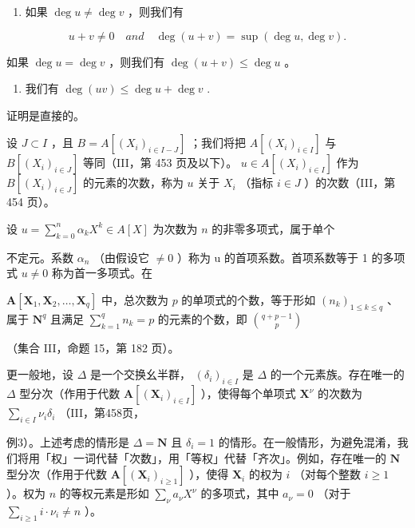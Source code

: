 \begin{enumerate}
\def\labelenumi{(\roman{enumi})}
\tightlist
\item
  如果 \(\deg u \neq \deg v\) ，则我们有
\end{enumerate}

\[
u + v \neq 0 \quad a n d \quad \deg (u + v) = \sup (\deg u, \deg v).
\]

如果 \(\deg u = \deg v\) ，则我们有 \(\deg (u + v) \leqslant \deg u\) 。

\begin{enumerate}
\def\labelenumi{(\roman{enumi})}
\setcounter{enumi}{1}
\tightlist
\item
  我们有 \(\deg(uv) \leqslant \deg u + \deg v\) .
\end{enumerate}

证明是直接的。

设 \(J \subset I\) ，且 \(B = A[(X_i)_{i \in I - J}]\) ；我们将把 \(A[(X_i)_{i \in I}]\) 与 \(B[(X_i)_{i \in J}]\) 等同（III，第 453 页及以下）。 \(u \in A[(X_i)_{i \in I}]\) 作为 \(B[(X_i)_{i \in J}]\) 的元素的次数，称为 \(u\) 关于 \(X_i\) （指标 \(i \in J\) ）的次数（III，第 454 页）。

设 \(u = \sum_{k=0}^{n} \alpha_k X^k \in A[X]\) 为次数为 \(n\) 的非零多项式，属于单个

不定元。系数 \(\alpha_{n}\) （由假设它 \(\neq0\) ）称为 u 的首项系数。首项系数等于 1 的多项式 \(u\neq0\) 称为首一多项式。在

 \(\mathbf{A}[\mathbf{X}_1, \mathbf{X}_2, \ldots, \mathbf{X}_q]\) 中，总次数为 \(p\) 的单项式的个数，等于形如 \((n_k)_{1 \leqslant k \leqslant q}\) 、属于 \(\mathbf{N}^q\) 且满足 \(\sum_{k=1}^{q} n_k = p\) 的元素的个数，即 \(\binom{q + p - 1}{p}\)

（集合 III，命题 15，第 182 页）。

更一般地，设 \(\Delta\) 是一个交换幺半群， \((\delta_i)_{i \in I}\) 是 \(\Delta\) 的一个元素族。存在唯一的 \(\Delta\) 型分次（作用于代数 \(\mathbf{A}[(\mathbf{X}_i)_{i \in I}]\) ），使得每个单项式 \(\mathbf{X}^\nu\) 的次数为 \(\sum_{i \in I} \nu_i \delta_i\) （III，第458页，

例3）。上述考虑的情形是 \(\Delta = \mathbf{N}\) 且 \(\delta_{i} = 1\) 的情形。在一般情形，为避免混淆，我们将用「权」一词代替「次数」，用「等权」代替「齐次」。例如，存在唯一的 \(\mathbf{N}\) 型分次（作用于代数 \(\mathbf{A}[(\mathbf{X}_{i})_{i\geqslant 1}]\) ），使得 \(\mathbf{X}_i\) 的权为 \(i\) （对每个整数 \(i \geqslant 1\) ）。权为 \(n\) 的等权元素是形如 \(\sum_{\nu} a_{\nu} X^{\nu}\) 的多项式，其中 \(a_{\nu} = 0\) （对于 \(\sum_{i \geqslant 1} i \cdot \nu_i \neq n\) ）。

